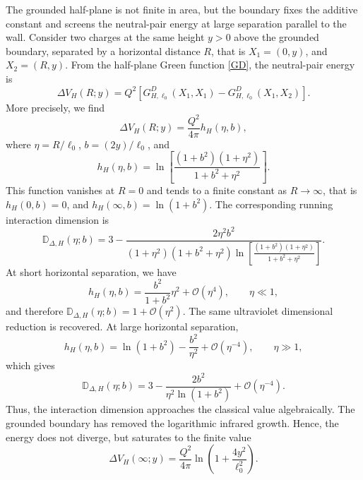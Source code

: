 \documentclass[nopacs,amsmath,amsfonts,amssymb,aps,superscriptaddress]{revtex4}
\begin{document}
The grounded half-plane is not finite in area, but the boundary fixes the additive constant and screens the neutral-pair energy at large separation parallel to the wall. Consider two charges at the same height $y>0$ above the grounded boundary, separated by a horizontal distance $R$, that is  $X_1=(0,y)$, and $X_2=(R,y)$. From the half-plane Green function \eqref{GD}, the neutral-pair energy is
\begin{equation}
  \Delta V_H(R;y)=Q^2\left[G_{H,\ell_0}^D(X_1,X_1)-G_{H,\ell_0}^D(X_1,X_2)\right].
\end{equation}
More precisely, we find
\begin{equation}
  \Delta V_H(R;y)=\frac{Q^2}{4\pi}h_H(\eta,b),
\end{equation}
where $\eta=R/\ell_0$, $b=(2y)/\ell_0$, and
\begin{equation}
  h_H(\eta,b)=\ln\left[\frac{(1+b^2)(1+\eta^2)}{1+b^2+\eta^2}\right].
\end{equation}
This function vanishes at $R=0$ and tends to a finite constant as $R\to\infty$, that is $h_H(0,b)=0$, and $h_H(\infty,b)=\ln(1+b^2)$. The corresponding running interaction dimension is
\begin{equation}
  \mathbb D_{\Delta,H}(\eta;b)=3-\frac{2\eta^2 b^2}{(1+\eta^2)(1+b^2+\eta^2)\ln\left[\frac{(1+b^2)(1+\eta^2)}{1+b^2+\eta^2}\right]}.
\end{equation}
At short horizontal separation, we have
\begin{equation}
  h_H(\eta,b)=\frac{b^2}{1+b^2}\eta^2+\mathcal{O}(\eta^4),\qquad\eta\ll 1,
\end{equation}
and therefore $\mathbb D_{\Delta,H}(\eta;b)=1+\mathcal{O}(\eta^2)$. The same ultraviolet dimensional reduction is recovered. At large horizontal separation,
\begin{equation}
h_H(\eta,b)=\ln(1+b^2)-\frac{b^2}{\eta^2}+\mathcal{O}(\eta^{-4}),\qquad\eta\gg 1,
\end{equation}
which gives
\begin{equation}
\mathbb D_{\Delta,H}(\eta;b)=3-\frac{2b^2}{\eta^2\ln(1+b^2)}+\mathcal{O}(\eta^{-4}).
\end{equation}
Thus, the interaction dimension approaches the classical value algebraically. The grounded boundary has removed the logarithmic infrared growth. Hence, the energy does not diverge, but saturates to the finite value
\begin{equation}
  \Delta V_H(\infty;y)=\frac{Q^2}{4\pi}\ln\left(1+\frac{4y^2}{\ell_0^2}\right).
\end{equation}
\end{document}
